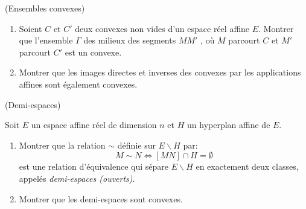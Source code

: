 \documentclass[a4paper,12pt,reqno]{amsart}
\begin{document}
\begin{exo} (Ensembles convexes)

  \begin{enumerate}
    \item Soient $C$ et $C'$ deux convexes non vides d'un espace réel affine $E$. Montrer que l'ensemble $\Gamma$ des milieux des segments $MM'$ , où $M$ parcourt $C$ et $M'$ parcourt $C'$ est un convexe.

    \item Montrer que les images directes et inverses des convexes par les applications affines sont également convexes.
  \end{enumerate}
\end{exo}


\begin{exo} (Demi-espaces)

  Soit $E$ un espace affine réel de dimension $n$ et $H$ un hyperplan affine de $E$.

  \begin{enumerate}

    \item Montrer que la relation $\sim $ définie sur $E\backslash H$ par:
      \[
        M\sim N\Longleftrightarrow[MN]\cap H=\emptyset
      \]
    est une relation d'équivalence qui sépare $E\backslash H$ en exactement deux classes, appelés \textit{demi-espaces (ouverts)}.

    \item Montrer que les demi-espaces sont convexes.
  \end{enumerate}
\end{exo}
\end{document}
